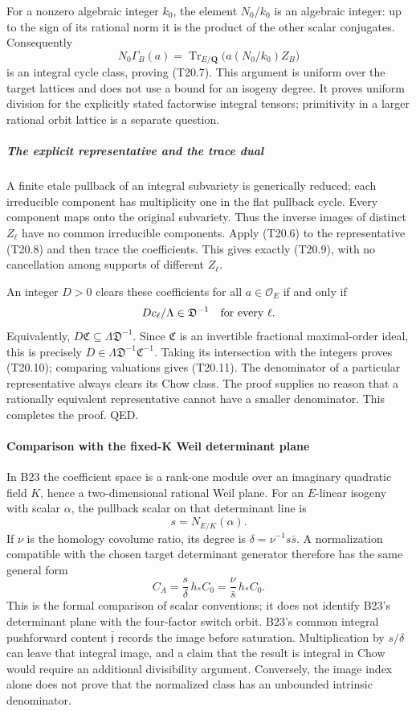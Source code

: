 For a nonzero algebraic integer \(k_0\), the element \(N_0/k_0\) is an algebraic integer: up to the sign of its rational norm it is the product of the other scalar conjugates. Consequently \[
 N_0\Gamma_B(a)
   =\operatorname{Tr}_{E/\mathbf Q}
       \bigl(a(N_0/k_0)Z_B\bigr)
\] is an integral cycle class, proving (T20.7). This argument is uniform over the target lattices and does not use a bound for an isogeny degree. It proves uniform division for the explicitly stated factorwise integral tensors; primitivity in a larger rational orbit lattice is a separate question.

\subparagraph{The explicit representative and the trace dual}\label{the-explicit-representative-and-the-trace-dual}

A finite etale pullback of an integral subvariety is generically reduced; each irreducible component has multiplicity one in the flat pullback cycle. Every component maps onto the original subvariety. Thus the inverse images of distinct \(Z_\ell\) have no common irreducible components. Apply (T20.6) to the representative (T20.8) and then trace the coefficients. This gives exactly (T20.9), with no cancellation among supports of different \(Z_\ell\).

An integer \(D>0\) clears these coefficients for all \(a\in\mathcal O_E\) if and only if \[
 D c_\ell/\Lambda\in\mathfrak D^{-1}
 \quad\hbox{for every }\ell.
\] Equivalently, \(D\mathfrak C\subseteq\Lambda\mathfrak D^{-1}\). Since \(\mathfrak C\) is an invertible fractional maximal-order ideal, this is precisely \(D\in\Lambda\mathfrak D^{-1}\mathfrak C^{-1}\). Taking its intersection with the integers proves (T20.10); comparing valuations gives (T20.11). The denominator of a particular representative always clears its Chow class. The proof supplies no reason that a rationally equivalent representative cannot have a smaller denominator. This completes the proof. QED.

\paragraph{Comparison with the fixed-K Weil determinant plane}\label{comparison-with-the-fixed-k-weil-determinant-plane}

In B23 the coefficient space is a rank-one module over an imaginary quadratic field \(K\), hence a two-dimensional rational Weil plane. For an \(E\)-linear isogeny with scalar \(\alpha\), the pullback scalar on that determinant line is \[
 s=N_{E/K}(\alpha).
\] If \(\nu\) is the homology covolume ratio, its degree is \(\delta=\nu^{-1}s\bar s\). A normalization compatible with the chosen target determinant generator therefore has the same general form \[
 C_A=\frac{s}{\delta}\,h_*C_0
     =\frac{\nu}{\bar s}\,h_*C_0.
 \tag{T20.14}
\] This is the formal comparison of scalar conventions; it does not identify B23's determinant plane with the four-factor switch orbit. B23's common integral pushforward content \(\bar{\mathfrak j}\) records the image before saturation. Multiplication by \(s/\delta\) can leave that integral image, and a claim that the result is integral in Chow would require an additional divisibility argument. Conversely, the image index alone does not prove that the normalized class has an unbounded intrinsic denominator.

